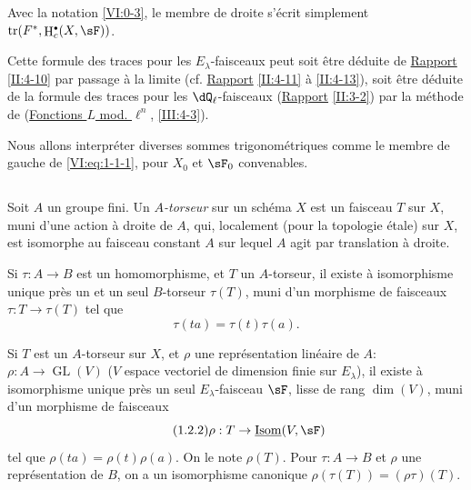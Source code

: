 \documentclass[oneside]{book}
\DeclareMathOperator{\gl}{GL}
\DeclareMathOperator{\h}{H}
\DeclareMathOperator{\tr}{tr}
\theoremstyle{sga-source}
\theoremstyle{sga-source-dash}
\theoremstyle{sga-source-dotdash}
\theoremstyle{sga-source-number-note-dash}
\theoremstyle{sga-source-note-number-dotdash}
\theoremstyle{sga-source-example-dotdash}
\theoremstyle{sga-source-inline-number}
\theoremstyle{sga-source-bare-number}
\theoremstyle{sga-source}
\let\oldbullet\bullet
\renewcommand{\bullet}{\textnormal{\tiny$\oldbullet$}}
\newcommand{\PrintPage}[1]{}\newcommand{\MathPage}[1]{}\newcommand{\PrintCite}[2]{#1}\newcommand{\var}[3]{#1}
\begin{document}
Avec la notation \ref{VI:0-3}, le membre de droite s'écrit simplement 
$\tr(F^\ast,\h_c^\bullet(X,\sF))$. 

Cette formule des traces pour les $E_\lambda$-faisceaux peut soit être 
déduite de \hyperref[II]{Rapport} \ref{II:4-10} par passage à la limite (cf. 
\hyperref[II]{Rapport} \ref{II:4-11} à \ref{II:4-13}), soit être déduite 
de la formule des traces pour les $\dQ_\ell$-faisceaux (\hyperref[II]{Rapport} 
\ref{II:3-2}) par la méthode de (\hyperref[III]{Fonctions $L$ mod. $\ell^n$}, 
\ref{III:4-3}). 

Nous allons interpréter diverses sommes trigonométriques comme le membre de 
gauche de \eqref{VI:eq:1-1-1}, pour $X_0$ et $\sF_0$ convenables. 





\PrintPage{170}
\subsection{}\label{VI:1-2}

Soit $A$ un groupe fini. Un \emph{$A$-torseur} sur un schéma $X$ est un 
faisceau $T$ sur $X$, muni d'une action à droite de $A$, qui, localement 
(pour la topologie étale) sur $X$, est isomorphe au faisceau constant $A$ sur 
lequel $A$ agit par translation à droite. 

Si $\tau:A\to B$ est un homomorphisme, et $T$ un $A$-torseur, il existe à 
isomorphisme unique près un et un seul $B$-torseur $\tau(T)$, muni d'un 
morphisme de faisceaux $\tau:T\to \tau(T)$ tel que 
\begin{equation*}\tag{1.2.1}\label{VI:eq:1-2-1}
  \tau(t a) = \tau(t) \tau(a)\text{.}
\end{equation*}

Si $T$ est un $A$-torseur sur $X$, et $\rho$ une représentation linéaire 
de $A$: $\rho:A\to \gl(V)$ ($V$ espace vectoriel de dimension finie sur 
$E_\lambda$), il existe à isomorphisme unique près un seul 
$E_\lambda$-faisceau $\sF$, lisse de rang $\dim(V)$, muni d'un morphisme de 
faisceaux 
\begin{equation*}\tag{1.2.2}\label{VI:eq:1-2-2}
  \rho:T\to \underline{\operatorname{Isom}}(V,\sF)
\end{equation*}
tel que $\rho(t a) = \rho(t) \rho(a)$. On le note $\rho(T)$. Pour 
$\tau:A\to B$ et $\rho$ une représentation de $B$, on a un isomorphisme 
canonique $\rho(\tau(T)) = (\rho\tau)(T)$. 
\end{document}
